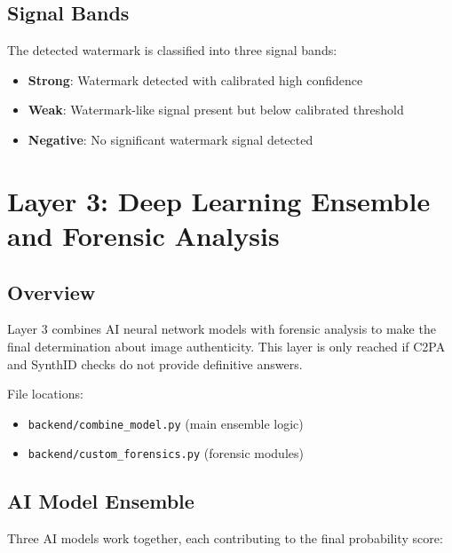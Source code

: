 \documentclass[12pt,a4paper]{book}
\begin{document}
\subsection{Signal Bands}
The detected watermark is classified into three signal bands:

\begin{itemize}
    \item \textbf{Strong}: Watermark detected with calibrated high confidence
    \item \textbf{Weak}: Watermark-like signal present but below calibrated threshold
    \item \textbf{Negative}: No significant watermark signal detected
\end{itemize}

\section{Layer 3: Deep Learning Ensemble and Forensic Analysis}
\label{sec:layer3}

\subsection{Overview}
Layer 3 combines AI neural network models with forensic analysis to make the final determination about image authenticity. This layer is only reached if C2PA and SynthID checks do not provide definitive answers.

File locations:
\begin{itemize}
    \item \texttt{backend/combine\_model.py} (main ensemble logic)
    \item \texttt{backend/custom\_forensics.py} (forensic modules)
\end{itemize}

\subsection{AI Model Ensemble}
\label{subsec:ensemble}

Three AI models work together, each contributing to the final probability score:
\end{document}
